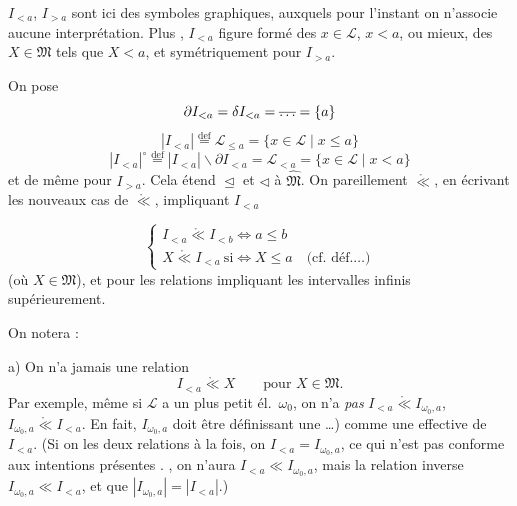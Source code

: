 \documentclass[11pt,a4paper]{article}
\begin{document}
$I_{<a}$, $I_{>a}$  sont ici des symboles graphiques, auxquels pour l'instant on n'associe aucune interprétation. Plus , \struck{\ill{}} $I_{<a}$ figure  formé des $x \in \mathcal{L}$, $x < a$, ou mieux, des $X \in \mathfrak{M}$ tels que $X < a$, et symétriquement pour $I_{>a}$.

On pose
\[
  \partial I_{<a} = \delta I_{<a} = \text{\struck{$\ldots$}} = \{a\}
\]
\[
  |I_{<a}| \overset{\mathrm{def}}{=} \mathcal{L}_{\leq a} = \{ x \in \mathcal{L} \mid x \leq a \}
\]
\[
  |I_{<a}|^{\circ} \overset{\mathrm{def}}{=} |I_{<a}| \smallsetminus \partial I_{<a} = \mathcal{L}_{<a} = \{ x \in \mathcal{L} \mid x < a \}
\]
et de même pour $I_{>a}$. Cela étend $\trianglelefteq$ et $\lhd$ à $\widehat{\mathfrak{M}}$. On  pareillement $\mathring{\ll}$, en écrivant les nouveaux cas de $\mathring{\ll}$, impliquant $I_{<a}$


\[
  \begin{cases}
    I_{<a} \mathrel{\mathring{\ll}} I_{<b} \iff a \leq b \\
    X \mathrel{\mathring{\ll}} I_{<a} \ \text{si} \iff X \leq a \quad \text{(cf.\ déf.\ldots)}
  \end{cases}
\]
(où $X \in \mathfrak{M}$), et  pour  les relations impliquant les intervalles infinis supérieurement.


On notera :

a) On n'a jamais une relation
\[
  I_{<a} \mathrel{\mathring{\ll}} X \qquad \text{pour } X \in \mathfrak{M} .
\]
Par exemple, même si $\mathcal{L}$ a un plus petit él.\ $\omega_0$, on n'a \emph{pas} $I_{<a} \mathrel{\mathring{\ll}} I_{\omega_0,a}$,   $I_{\omega_0,a} \mathrel{\mathring{\ll}} I_{<a}$. En fait, $I_{\omega_0,a}$ doit être  définissant une \ldots) comme une \emph{} effective de $I_{<a}$. (Si on   les deux relations à la fois, on   $I_{<a} = I_{\omega_0,a}$, ce qui n'est pas conforme aux intentions présentes \ill{}. , on n'aura \struck{\ill{}}  $I_{<a} \ll I_{\omega_0,a}$, mais la relation inverse  $I_{\omega_0,a} \ll I_{<a}$, et \ill{} que $|I_{\omega_0,a}| = |I_{<a}|$.)
\end{document}
